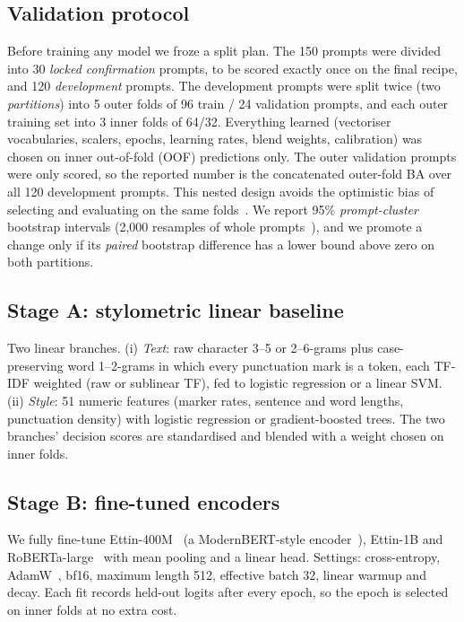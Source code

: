 \documentclass[10pt,twocolumn,letterpaper]{article}
\begin{document}
\subsection{Validation protocol}
\label{sec:validation}
Before training any model we froze a split plan. The 150 prompts were divided into 30 \emph{locked confirmation} prompts, to be scored exactly once on the final recipe, and 120 \emph{development} prompts. The development prompts were split twice (two \emph{partitions}) into 5 outer folds of 96 train / 24 validation prompts, and each outer training set into 3 inner folds of 64/32. Everything learned (vectoriser vocabularies, scalers, epochs, learning rates, blend weights, calibration) was chosen on inner out-of-fold (OOF) predictions only. The outer validation prompts were only scored, so the reported number is the concatenated outer-fold BA over all 120 development prompts. This nested design avoids the optimistic bias of selecting and evaluating on the same folds~\cite{varma2006}. We report 95\% \emph{prompt-cluster} bootstrap intervals (2,000 resamples of whole prompts~\cite{efron1993}), and we promote a change only if its \emph{paired} bootstrap difference has a lower bound above zero on both partitions.

\subsection{Stage A: stylometric linear baseline}
Two linear branches. (i) \emph{Text}: raw character 3--5 or 2--6-grams plus case-preserving word 1--2-grams in which every punctuation mark is a token, each TF-IDF weighted (raw or sublinear TF), fed to logistic regression or a linear SVM. (ii) \emph{Style}: 51 numeric features (marker rates, sentence and word lengths, punctuation density) with logistic regression or gradient-boosted trees. The two branches' decision scores are standardised and blended with a weight chosen on inner folds.

\subsection{Stage B: fine-tuned encoders}
We fully fine-tune Ettin-400M~\cite{weller2025ettin} (a ModernBERT-style encoder~\cite{warner2024modernbert}), Ettin-1B and RoBERTa-large~\cite{liu2019roberta} with mean pooling and a linear head. Settings: cross-entropy, AdamW~\cite{loshchilov2019}, bf16, maximum length 512, effective batch 32, linear warmup and decay. Each fit records held-out logits after every epoch, so the epoch is selected on inner folds at no extra cost.
\end{document}
